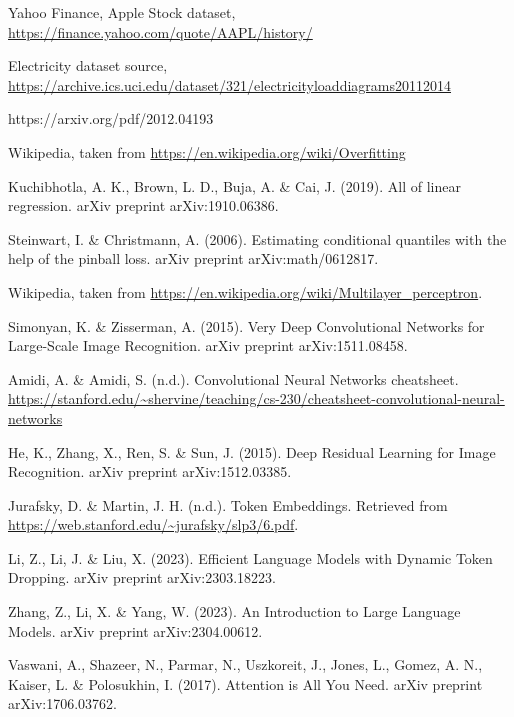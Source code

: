 
\begin{thebibliography}{99}


	 Yahoo Finance, Apple Stock dataset, \url{https://finance.yahoo.com/quote/AAPL/history/}

	 Electricity dataset source, \url{https://archive.ics.uci.edu/dataset/321/electricityloaddiagrams20112014}

	 https://arxiv.org/pdf/2012.04193

	 Wikipedia, taken from \url{https://en.wikipedia.org/wiki/Overfitting}

	 Kuchibhotla, A. K., Brown, L. D., Buja, A. \& Cai, J. (2019). All of linear regression. arXiv preprint arXiv:1910.06386.

	 Steinwart, I. \& Christmann, A. (2006). Estimating conditional quantiles with the help of the pinball loss. arXiv preprint arXiv:math/0612817.

	 Wikipedia, taken from \url{https://en.wikipedia.org/wiki/Multilayer_perceptron}.

	 Simonyan, K. \& Zisserman, A. (2015). Very Deep Convolutional Networks for Large-Scale Image Recognition. arXiv preprint arXiv:1511.08458.

	 Amidi, A. \& Amidi, S. (n.d.). Convolutional Neural Networks cheatsheet. \url{https://stanford.edu/~shervine/teaching/cs-230/cheatsheet-convolutional-neural-networks}

	 He, K., Zhang, X., Ren, S. \& Sun, J. (2015). Deep Residual Learning for Image Recognition. arXiv preprint arXiv:1512.03385.

	 Jurafsky, D. \& Martin, J. H. (n.d.). Token Embeddings. Retrieved from \url{https://web.stanford.edu/~jurafsky/slp3/6.pdf}.

	 Li, Z., Li, J. \& Liu, X. (2023). Efficient Language Models with Dynamic Token Dropping. arXiv preprint arXiv:2303.18223.

	 Zhang, Z., Li, X. \& Yang, W. (2023). An Introduction to Large Language Models. arXiv preprint arXiv:2304.00612.

	 Vaswani, A., Shazeer, N., Parmar, N., Uszkoreit, J., Jones, L., Gomez, A. N., Kaiser, L. \& Polosukhin, I. (2017). Attention is All You Need. arXiv preprint arXiv:1706.03762.


\end{thebibliography}
